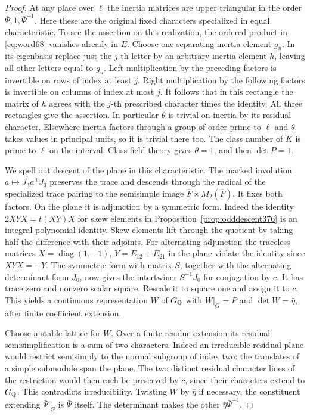\documentclass[a4paper,11pt]{article}
\theoremstyle{definition}
\theoremstyle{remark}
\numberwithin{equation}{section}
\begin{document}
\begin{proof}
At any place over \(\ell\) the inertia matrices are upper
triangular in the order \(\bar\Psi,1,\bar\Psi^{-1}\).
Here these are the original fixed characters specialized
in equal characteristic. To see the assertion on this
realization, the ordered product in \eqref{eq:word68}
vanishes already in \(E\). Choose one separating inertia
element \(g_u\). In its eigenbasis replace just the \(j\)-th
letter by an arbitrary inertia element \(h\), leaving all
other letters equal to \(g_u\). Left multiplication by the
preceding factors is invertible on rows of index at least
\(j\). Right multiplication by the following factors is
invertible on columns of index at most \(j\). It follows
that in this rectangle the matrix of \(h\) agrees with
the \(j\)-th prescribed character times the identity.
All three rectangles give the assertion. In particular
\(\theta\) is trivial on inertia by its residual character.
Elsewhere inertia factors through a group of order prime
to \(\ell\) and \(\theta\) takes values in principal units,
so it is trivial there too. The class number of \(K\) is
prime to \(\ell\) on the interval. Class field theory gives
\(\theta=1\), and then \(\det P=1\).

We spell out descent of the plane in this characteristic.
The marked involution \(a\mapsto J_3a^{\mathsf T}J_3\)
preserves the trace and descends through the radical of
the specialized trace pairing to the semisimple image
\(\overline F\times M_2(\overline F)\). It fixes both
factors. On the plane it is adjunction by a symmetric
form. Indeed the identity \(2XYX=t(XY)X\) for skew elements
in Proposition~\ref{prop:odddescent376} is an integral
polynomial identity. Skew elements lift through the quotient
by taking half the difference with their adjoints. For
alternating adjunction the traceless matrices
\(X=\operatorname{diag}(1,-1)\), \(Y=E_{12}+E_{21}\)
in the plane violate the identity since \(XYX=-Y\).
The symmetric form with matrix \(S\), together with the
alternating determinant form \(J_0\), now gives the
intertwiner \(S^{-1}J_0\) for conjugation by \(c\).
It has trace zero and nonzero scalar square. Rescale it
to square one and assign it to \(c\). This yields a
continuous representation \(W\) of \(G_\mathbb Q\) with
\(W|_G=P\) and \(\det W=\bar\eta\), after finite
coefficient extension.

Choose a stable lattice for \(W\). Over a finite residue
extension its residual semisimplification is a sum of
two characters. Indeed an irreducible residual plane would
restrict semisimply to the normal subgroup of index two:
the translates of a simple submodule span the plane.
The two distinct residual character lines of the restriction
would then each be preserved by \(c\), since their characters
extend to \(G_\mathbb Q\). This contradicts irreducibility.
Twisting \(W\) by \(\bar\eta\) if necessary, the constituent
extending \(\bar\Psi|_G\) is \(\bar\Psi\) itself. The
determinant makes the other \(\bar\eta\bar\Psi^{-1}\).


\end{proof}
\end{document}
